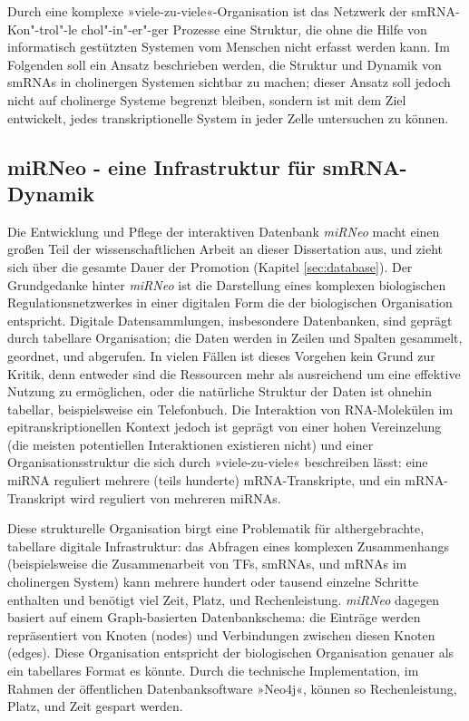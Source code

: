 Durch eine komplexe »viele-zu-viele«-Organisation ist das Netzwerk der smRNA-Kon"-trol"-le chol"-in"-er"-ger Prozesse eine Struktur, die ohne die Hilfe von informatisch gestützten Systemen vom Menschen nicht erfasst werden kann. Im Folgenden soll ein Ansatz beschrieben werden, die Struktur und Dynamik von smRNAs in cholinergen Systemen sichtbar zu machen; dieser Ansatz soll jedoch nicht auf cholinerge Systeme begrenzt bleiben, sondern ist mit dem Ziel entwickelt, jedes transkriptionelle System in jeder Zelle untersuchen zu können.

\subsection{miRNeo - eine Infrastruktur für smRNA-Dynamik}
Die Entwicklung und Pflege der interaktiven Datenbank \emph{miRNeo} macht einen großen Teil der wissenschaftlichen Arbeit an dieser Dissertation aus, und zieht sich über die gesamte Dauer der Promotion (Kapitel \ref{sec:database}). Der Grundgedanke hinter \emph{miRNeo} ist die Darstellung eines komplexen biologischen Regulationsnetzwerkes in einer digitalen Form die der biologischen Organisation entspricht. Digitale Datensammlungen, insbesondere Datenbanken, sind geprägt durch tabellare Organisation; die Daten werden in Zeilen und Spalten gesammelt, geordnet, und abgerufen. In vielen Fällen ist dieses Vorgehen kein Grund zur Kritik, denn entweder sind die Ressourcen mehr als ausreichend um eine effektive Nutzung zu ermöglichen, oder die natürliche Struktur der Daten ist ohnehin tabellar, beispielsweise ein Telefonbuch. Die Interaktion von RNA-Molekülen im epitranskriptionellen Kontext jedoch ist geprägt von einer hohen Vereinzelung (die meisten potentiellen Interaktionen existieren nicht) und einer Organisationsstruktur die sich durch »viele-zu-viele« beschreiben lässt: eine miRNA reguliert mehrere (teils hunderte) mRNA-Transkripte, und ein mRNA-Transkript wird reguliert von mehreren miRNAs.

Diese strukturelle Organisation birgt eine Problematik für althergebrachte, tabellare digitale Infrastruktur: das Abfragen eines komplexen Zusammenhangs (beispielsweise die Zusammenarbeit von TFs, smRNAs, und mRNAs im cholinergen System) kann mehrere hundert oder tausend einzelne Schritte enthalten und benötigt viel Zeit, Platz, und Rechenleistung. \emph{miRNeo} dagegen basiert auf einem Graph-basierten Datenbankschema: die Einträge werden repräsentiert von Knoten (nodes) und Verbindungen zwischen diesen Knoten (edges). Diese Organisation entspricht der biologischen Organisation genauer als ein tabellares Format es könnte. Durch die technische Implementation, im Rahmen der öffentlichen Datenbanksoftware »Neo4j«, können so Rechenleistung, Platz, und Zeit gespart werden.

